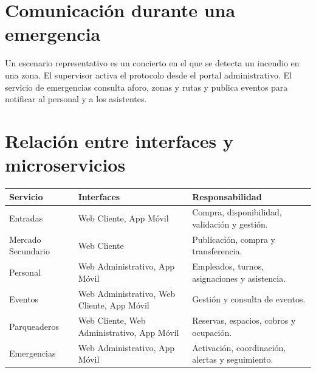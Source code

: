 \documentclass[12pt,a4paper]{article}
\begin{document}
\section{Comunicación durante una emergencia}

Un escenario representativo es un concierto en el que se detecta un incendio en una zona. El supervisor activa el protocolo desde el portal administrativo. El servicio de emergencias consulta aforo, zonas y rutas y publica eventos para notificar al personal y a los asistentes.

\begin{center}
\end{center}

\section{Relación entre interfaces y microservicios}

\begin{longtable}{p{4cm}p{4cm}p{6cm}}
\toprule
\textbf{Servicio} & \textbf{Interfaces} & \textbf{Responsabilidad}\\
\midrule
Entradas & Web Cliente, App Móvil & Compra, disponibilidad, validación y gestión.\\
Mercado Secundario & Web Cliente & Publicación, compra y transferencia.\\
Personal & Web Administrativo, App Móvil & Empleados, turnos, asignaciones y asistencia.\\
Eventos & Web Administrativo, Web Cliente, App Móvil & Gestión y consulta de eventos.\\
Parqueaderos & Web Cliente, Web Administrativo, App Móvil & Reservas, espacios, cobros y ocupación.\\
Emergencias & Web Administrativo, App Móvil & Activación, coordinación, alertas y seguimiento.\\
\bottomrule
\end{longtable}
\end{document}
